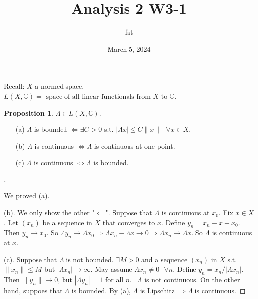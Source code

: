 \documentclass{article}
\title{Analysis 2 W3-1}
\author{fat}
\date{March 5, 2024}
\newcommand{\sfa}{\text{  } \forall}
\theoremstyle{definition}
\newtheorem{prop}{Proposition}
\newenvironment{proofs}[1][\proofname]{%
  \begin{proof}[#1]$ $\par\nobreak\ignorespaces
}{%
  \end{proof}
}
\begin{document}
\maketitle
\thispagestyle{fancy}
\renewcommand{\footrulewidth}{0.4pt}
\cfoot{\thepage}
\renewcommand{\headrulewidth}{0.4pt}

\par Recall: $X$ a normed space.
$L(X, \mathbb{C}) = \text{ space of all linear functionals from } X \text{ to } \mathbb{C}$.

\begin{prop}
	$\Lambda \in L(X, \mathbb{C})$. 

	\begin{enumerate}
		\item[(a)] $\Lambda$ is bounded $\Leftrightarrow \exists C > 0$ s.t. $|\Lambda x| \leq C\| x \| \sfa x \in X$.

		\item[(b)] $\Lambda$ is continuous $\Leftrightarrow \Lambda$ is continuous at one point.

		\item[(c)] $\Lambda$ is continuous $\Leftrightarrow \Lambda$ is bounded.
	\end{enumerate}
\end{prop}

\begin{proofs}
	We proved (a). 
	\par (b). We only show the other "$\Leftarrow$". 
	Suppose that $\Lambda$ is continuous at $x_0$.
	Fix $x \in X$. 
	Let $(x_n)$ be a sequence in $X$ that converges to $x$.
	Define $y_n = x_n - x + x_0$.
	Then $y_n \to x_0$.
	So $\Lambda y_n \to \Lambda x_0 \Rightarrow \Lambda x_n - \Lambda x \to 0 \Rightarrow \Lambda x_n \to \Lambda x$.
	So $\Lambda$ is continuous at $x$.
	\par (c). Suppose that $\Lambda$ is not bounded. 
	$\exists M > 0$ and a sequence $(x_n)$ in $X$ s.t. $\|x_n\| \leq M$ but $|\Lambda x_n| \to \infty$.
	May assume $\Lambda x_n \neq 0 \sfa n$. 
	Define $y_n = x_n / |\Lambda x_n|$.
	Then $\|y_n \| \to 0$, but $| \Lambda y_n| = 1$ for all $n$. \
	$\Lambda$ is not continuous. 
	On the other hand, suppoes that $\Lambda$ is bounded. By (a), $\Lambda$ is Lipschitz $\Rightarrow \Lambda$ is continuous. 

\end{proofs}
\end{document}
